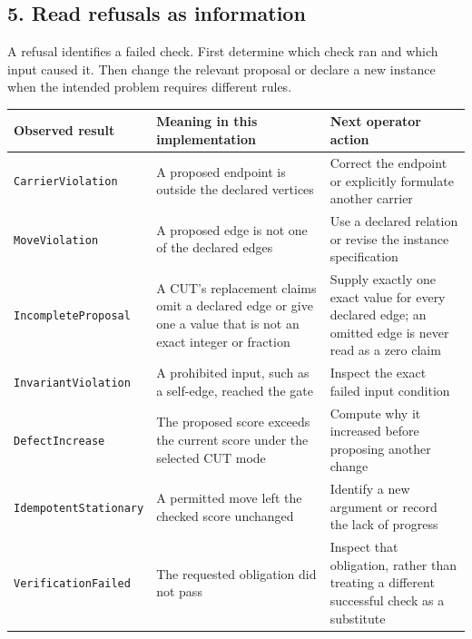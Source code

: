 \documentclass[
  11pt,
]{article}
\newcommand{\passthrough}[1]{#1}
\begin{document}
\subsection{5. Read refusals as
information}\label{read-refusals-as-information}

A refusal identifies a failed check. First determine which check ran and
which input caused it. Then change the relevant proposal or declare a
new instance when the intended problem requires different rules.

\begin{longtable}[]{@{}
  >{\raggedright\arraybackslash}p{}
  >{\raggedright\arraybackslash}p{}
  >{\raggedright\arraybackslash}p{}@{}}
\toprule\noalign{}
\begin{minipage}[b]{\linewidth}\raggedright
Observed result
\end{minipage} & \begin{minipage}[b]{\linewidth}\raggedright
Meaning in this implementation
\end{minipage} & \begin{minipage}[b]{\linewidth}\raggedright
Next operator action
\end{minipage} \\
\midrule\noalign{}
\endhead
\bottomrule\noalign{}
\endlastfoot
\passthrough{\lstinline!CarrierViolation!} & A proposed endpoint is
outside the declared vertices & Correct the endpoint or explicitly
formulate another carrier \\
\passthrough{\lstinline!MoveViolation!} & A proposed edge is not one of
the declared edges & Use a declared relation or revise the instance
specification \\
\passthrough{\lstinline!IncompleteProposal!} & A CUT's replacement
claims omit a declared edge or give one a value that is not an exact
integer or fraction & Supply exactly one exact value for every declared
edge; an omitted edge is never read as a zero claim \\
\passthrough{\lstinline!InvariantViolation!} & A prohibited input, such
as a self-edge, reached the gate & Inspect the exact failed input
condition \\
\passthrough{\lstinline!DefectIncrease!} & The proposed score exceeds
the current score under the selected CUT mode & Compute why it increased
before proposing another change \\
\passthrough{\lstinline!IdempotentStationary!} & A permitted move left
the checked score unchanged & Identify a new argument or record the lack
of progress \\
\passthrough{\lstinline!VerificationFailed!} & The requested obligation
did not pass & Inspect that obligation, rather than treating a different
successful check as a substitute \\
\end{longtable}
\end{document}
